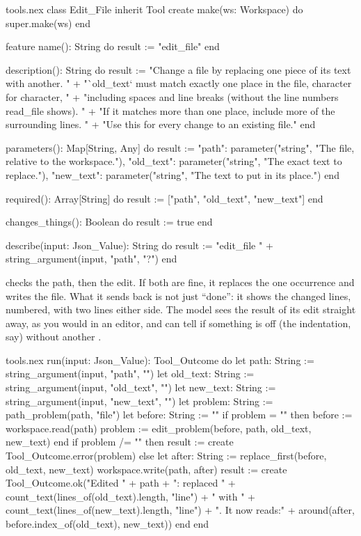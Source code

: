 \begin{append}{tools.nex}
class Edit_File inherit Tool
create
  make(ws: Workspace) do
    super.make(ws)
  end

feature
  name(): String do
    result := "edit_file"
  end

  description(): String do
    result := "Change a file by replacing one piece of its text with another. "
      + "`old_text` must match exactly one place in the file, character for character, "
      + "including spaces and line breaks (without the line numbers read_file shows). "
      + "If it matches more than one place, include more of the surrounding lines. "
      + "Use this for every change to an existing file."
  end

  parameters(): Map[String, Any] do
    result := {"path": parameter("string", "The file, relative to the workspace."),
      "old_text": parameter("string", "The exact text to replace."),
      "new_text": parameter("string", "The text to put in its place.")}
  end

  required(): Array[String] do
    result := ["path", "old_text", "new_text"]
  end

  changes_things(): Boolean do
    result := true
  end

  describe(input: Json_Value): String do
    result := "edit_file " + string_argument(input, "path", "?")
  end
\end{append}

 checks the path, then the edit. If both are fine, it replaces
the one occurrence and writes the file. What it sends back is not just
``done'': it shows the changed lines, numbered, with two lines either
side. The model sees the result of its edit straight away, as you would in
an editor, and can tell if something is off (the indentation, say)
without another .

\begin{continued}{tools.nex}
  run(input: Json_Value): Tool_Outcome do
    let path: String := string_argument(input, "path", "")
    let old_text: String := string_argument(input, "old_text", "")
    let new_text: String := string_argument(input, "new_text", "")
    let problem: String := path_problem(path, "file")
    let before: String := ""
    if problem = "" then
      before := workspace.read(path)
      problem := edit_problem(before, path, old_text, new_text)
    end
    if problem /= "" then
      result := create Tool_Outcome.error(problem)
    else
      let after: String := replace_first(before, old_text, new_text)
      workspace.write(path, after)
      result := create Tool_Outcome.ok("Edited " + path + ": replaced "
        + count_text(lines_of(old_text).length, "line") + " with "
        + count_text(lines_of(new_text).length, "line") + ". It now reads:\n"
        + around(after, before.index_of(old_text), new_text))
    end
  end
\end{continued}

